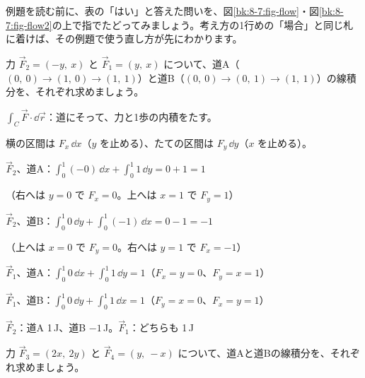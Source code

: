 例題を読む前に、表の「はい」と答えた問いを、図\ref{bk:8-7:fig-flow}・図\ref{bk:8-7:fig-flow2}の上で指でたどってみましょう。考え方の1行めの「場合」と同じ札に着けば、その例題で使う直し方が先にわかります。

\begin{reidai}[軸に平行な道]
力 $\vec F_2=(-y,\ x)$ と $\vec F_1=(y,\ x)$ について、道A（$(0,\ 0)\to(1,\ 0)\to(1,\ 1)$）と道B（$(0,\ 0)\to(0,\ 1)\to(1,\ 1)$）の線積分を、それぞれ求めましょう。\par
\kangaekata {}\par
{}\enspace $\int_C\vec F\cdot\dd\vec r$：道にそって、力と1歩の内積をたす。\par
{}\enspace 横の区間は $F_x\,\dd x$（$y$ を止める）、たての区間は $F_y\,\dd y$（$x$ を止める）。\par
\shiki\kviiihs{}\zw{} $\vec F_2$、道A：$\int_0^1(-0)\,\dd x+\int_0^1 1\,\dd y=0+1=1$\par
\kviiihb （右へは $y=0$ で $F_x=0$。上へは $x=1$ で $F_y=1$）\par
\kviiiha $\vec F_2$、道B：$\int_0^1 0\,\dd y+\int_0^1(-1)\,\dd x=0-1=-1$\par
\kviiihb （上へは $x=0$ で $F_y=0$。右へは $y=1$ で $F_x=-1$）\par
\kviiiha $\vec F_1$、道A：$\int_0^1 0\,\dd x+\int_0^1 1\,\dd y=1$\quad （$F_x=y=0$、$F_y=x=1$）\par
\kviiiha $\vec F_1$、道B：$\int_0^1 0\,\dd y+\int_0^1 1\,\dd x=1$\quad （$F_y=x=0$、$F_x=y=1$）\par
\kotae $\vec F_2$：道A 1\,J、道B $-1$\,J。$\vec F_1$：どちらも 1\,J
\end{reidai}

\begin{jibun}
力 $\vec F_3=(2x,\ 2y)$ と $\vec F_4=(y,\ -x)$ について、道Aと道Bの線積分を、それぞれ求めましょう。
\end{jibun}

